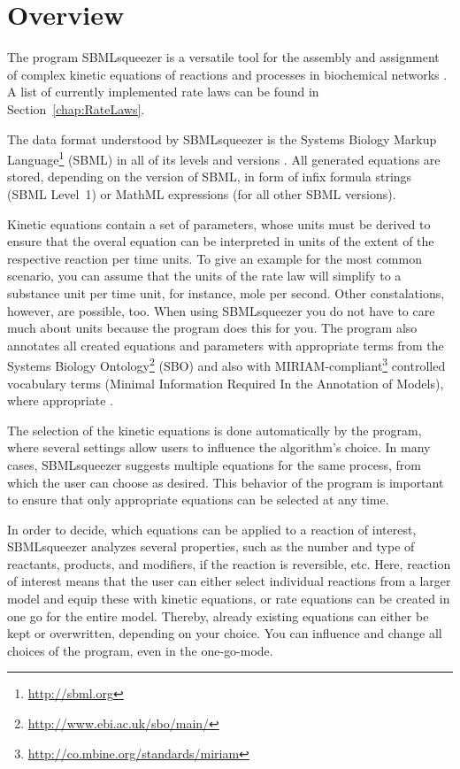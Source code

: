 \chapter{Overview}

The program SBMLsqueezer is a versatile tool for the assembly and assignment of
complex kinetic equations of reactions and processes in biochemical networks
\citep{Draeger2008, Draeger2010a, Draeger2011a}.
A list of currently implemented rate laws can be found in 
Section~\vref{chap:RateLaws}.

The data format understood by SBMLsqueezer is the Systems Biology Markup
Language\footnote{\url{http://sbml.org}} (SBML) in all of its levels and
versions \citep{Hucka2001, Hucka2003, M.Hucka03012003, Hucka2007, Hucka2008,
Hucka2010a, Finney2003, Finney2006}.
All generated equations are stored, depending on the version of SBML, in form of
infix formula strings (SBML Level~1) or MathML \citep{Buswell1999} expressions
(for all other SBML versions).

Kinetic equations contain a set of parameters, whose units must be derived to
ensure that the overal equation can be interpreted in units of the extent of the
respective reaction per time units.
To give an example for the most common scenario, you can assume that the units
of the rate law will simplify to a substance unit per time unit, for instance,
mole per second.
Other constalations, however, are possible, too.
When using SBMLsqueezer you do not have to care much about units because the
program does this for you.
The program also annotates all created equations and parameters with appropriate
terms from the Systems Biology 
Ontology\footnote{\url{http://www.ebi.ac.uk/sbo/main/}} (SBO) and also
with MIRIAM-compliant\footnote{\url{http://co.mbine.org/standards/miriam}}
controlled vocabulary terms (Minimal Information Required In the Annotation of
Models), where appropriate \citep{Le2005, Novere2006b,
Laible2007, Courtot2011}.

The selection of the kinetic equations is done automatically by the program,
where several settings allow users to influence the algorithm's choice.
In many cases, SBMLsqueezer suggests multiple equations for the same process,
from which the user can choose as desired.
This behavior of the program is important to ensure that only appropriate
equations can be selected at any time.

In order to decide, which equations can be applied to a reaction of interest,
SBMLsqueezer analyzes several properties, such as the number and type of
reactants, products, and modifiers, if the reaction is reversible, etc.
Here, reaction of interest means that the user can either select individual
reactions from a larger model and equip these with kinetic equations, or rate
equations can be created in one go for the entire model.
Thereby, already existing equations can either be kept or overwritten, depending
on your choice.
You can influence and change all choices of the program, even in the one-go-mode.

